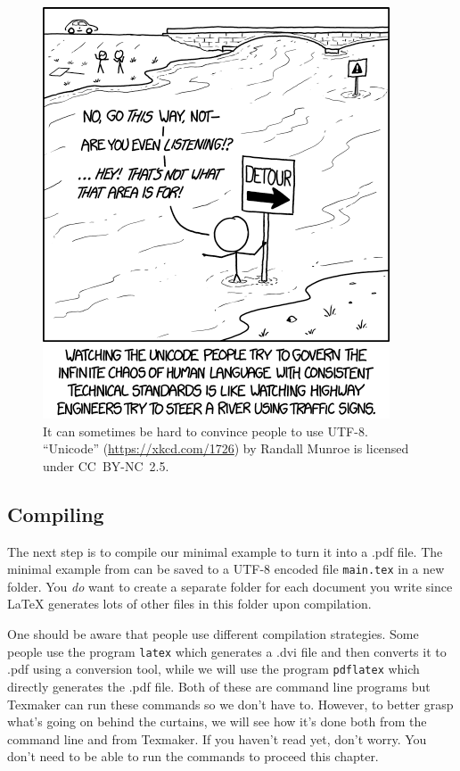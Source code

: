 \begin{figure}
	\centering
	\includegraphics[scale=1,resolution=150]{graphics/unicode.png}
	\caption{It can sometimes be hard to convince people to use UTF-8. ``Unicode'' (\url{https://xkcd.com/1726}) by Randall Munroe is licensed under \mbox{CC~BY-NC~2.5}.}
	\label{fig:latex:unicode}
\end{figure}

\subsection{Compiling}\label{sec:latex:compiling}
The next step is to compile our minimal example to turn it into a .pdf file. The minimal example from  can be saved to a UTF-8 encoded file \texttt{main.tex} in a new folder. You \emph{do} want to create a separate folder for each document you write since \LaTeX{} generates lots of other files in this folder upon compilation.

One should be aware that people use different compilation strategies. Some people use the program \texttt{latex} which generates a .dvi file and then converts it to .pdf using a conversion tool, while we will use the program \texttt{pdflatex} which directly generates the .pdf file. Both of these are command line programs but Texmaker can run these commands so we don't have to. However, to better grasp what's going on behind the curtains, we will see how it's done both from the command line and from Texmaker. If you haven't read  yet, don't worry. You don't need to be able to run the commands to proceed this chapter.

